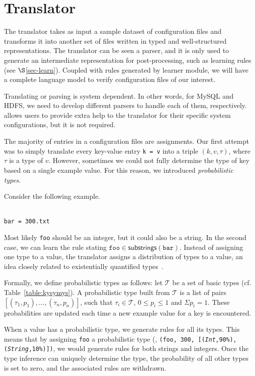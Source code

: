 
\section{Translator}
\label{sec-trans}

The translator takes as input a sample dataset of configuration files and transforms it into another set of files written in
typed and well-structured representations.
The translator can be seen a parser, and it is only
used to generate an intermediate representation for post-processing, 
such as learning rules (see $\S$\ref{sec-learn}).
Coupled with rules generated by learner module,
we will have a complete language model to verify configuration files
of our interest.

Translating or parsing is system dependent. In other words, for MySQL
and HDFS, we need to develop different parsers to handle each of them,
respectively. \app allows users to 
provide extra help to the translator
for their specific system configurations,
but it is not required.

The majority of entries in a configuration files are assignments. Our first attempt was to simply
translate every key-value entry {\tt {k = v}} into a triple $(k, v, \tau)$, where $\tau$ is a type of 
$v$. However, sometimes we could not fully determine the type of key 
based on a single example value. For this reason, we introduced {\emph {probabilistic types}}.

Consider the following example.

\\
{\tt {bar = 300.txt}}

Most likely {\tt foo} should be an integer, but it could also be a string.
In the second case, we can learn the rule stating 
$ \texttt{foo} \in \textsf{substrings}(\texttt{bar})$. 
Instead of assigning one type to a value, the translator assigns a distribution of types 
to a value, an idea closely related to existentially quantified 
types~\cite{Launchbury93lazyfunctional}. 

Formally, we define probabilistic types as follows: let $\mathcal{T}$ be a set of basic types (cf. Table~\ref{table:kysymys}).
A probabilistic type built from $\mathcal{T}$ is a list of pairs 
$[(\tau_1, p_1),\ldots,(\tau_n, p_n)]$,
such that $\tau_i \in \mathcal{T}$, $0 \le p_i \le 1$ 
and $\Sigma p_i = 1$. 
These probabilities are updated each time a new example value 
for a key is encountered.

When a value has a probabilistic type, we generate rules for all its types.
This means that by assigning {\texttt{foo}} a probabilistic type 
(\eg, {\tt (\texttt{foo}, 300, [(\textsl{Int},90\%), 
(\textsl{String},10\%)])},
we would generate rules for both strings and integers.
Once the type inference can uniquely determine the type, 
the probability of all other types is set to zero, 
and the associated rules are withdrawn.

